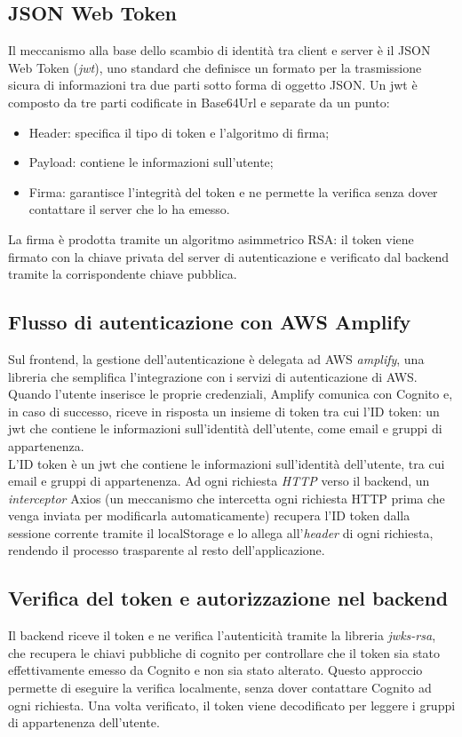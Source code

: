 \subsection{JSON Web Token}
Il meccanismo alla base dello scambio di identità tra client e server è il JSON Web Token ({\emph{\gls{jwt}}\glsfirstoccur}), uno standard che definisce un formato per la trasmissione sicura di informazioni tra due parti sotto forma di oggetto JSON. Un \gls{jwt} è composto da tre parti codificate in \emph{}{Base64Url} e separate da un punto:
\begin{itemize}
    \item Header: specifica il tipo di token e l'algoritmo di firma;
    \item Payload: contiene le informazioni sull'utente;
    \item Firma: garantisce l'integrità del token e ne permette la verifica senza dover contattare il server che lo ha emesso.
\end{itemize}
La firma è prodotta tramite un algoritmo asimmetrico RSA: il token viene firmato con la chiave privata del server di autenticazione e verificato dal backend tramite la corrispondente chiave pubblica.

\subsection{Flusso di autenticazione con AWS Amplify}
Sul frontend, la gestione dell'autenticazione è delegata ad AWS {\emph{\gls{amplify}}\glsfirstoccur}, una libreria che semplifica l'integrazione con i servizi di autenticazione di AWS. Quando l'utente inserisce le proprie credenziali, Amplify comunica con Cognito e, in caso di successo, riceve in risposta un insieme di token tra cui l'ID token: un \gls{jwt} che contiene le informazioni sull'identità dell'utente, come email e gruppi di appartenenza.\\

L'ID token è un \gls{jwt} che contiene le informazioni sull'identità dell'utente, tra cui email e gruppi di appartenenza. Ad ogni richiesta \emph{HTTP} verso il backend, un {\emph{\gls{interceptor}}\glsfirstoccur} Axios (un meccanismo che intercetta ogni richiesta HTTP prima che venga inviata per modificarla automaticamente) recupera l'ID token dalla sessione corrente tramite il localStorage e lo allega all'\emph{header} di ogni richiesta, rendendo il processo trasparente al resto dell'applicazione.

\subsection[Autenticazione nel backend]{Verifica del token e autorizzazione nel backend}
Il backend riceve il token e ne verifica l'autenticità tramite la libreria \emph{jwks-rsa}, che recupera le chiavi pubbliche di \gls{cognito} per controllare che il token sia stato effettivamente emesso da Cognito e non sia stato alterato. Questo approccio permette di eseguire la verifica localmente, senza dover contattare Cognito ad ogni richiesta. Una volta verificato, il token viene decodificato per leggere i gruppi di appartenenza  dell'utente.\\

